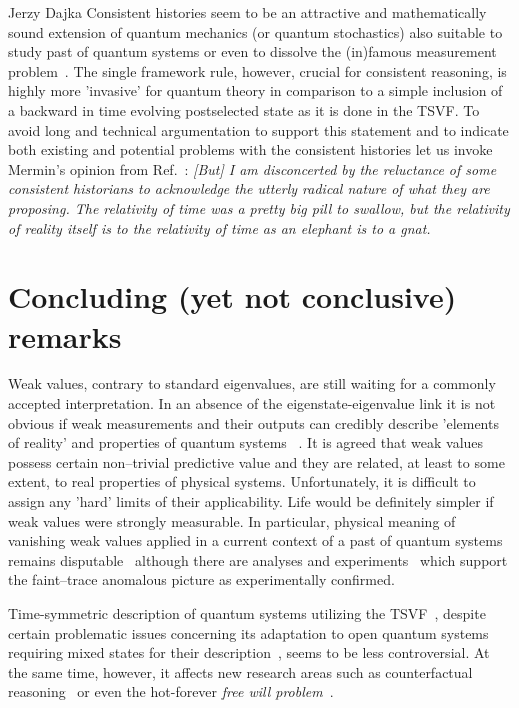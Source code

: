 \begin{artengenv}{Jerzy Dajka}
%
Consistent histories seem to be an attractive and mathematically sound extension of quantum mechanics (or quantum stochastics) also suitable to study past of quantum systems  or even  to dissolve the  (in)famous measurement problem~\parencite{GRIFFITHS_measur,Griffiths_reason}. The single framework rule, however, crucial for consistent reasoning, is highly more 'invasive' for quantum theory in comparison to a simple inclusion of a backward in time evolving postselected state as it is done in the TSVF. To avoid long and technical argumentation  to support this statement and to indicate both existing and potential problems with the consistent histories let us invoke Mermin's opinion from   
Ref.~\parencite{mermin}:
{\it [But] I am disconcerted by the reluctance of some consistent historians to
acknowledge the utterly radical nature of what they are proposing. The relativity of time was a pretty big pill to swallow, but the relativity of reality itself is
to the relativity of time as an elephant is to a gnat.}

\section{Concluding (yet not conclusive) remarks}

Weak values, contrary to standard eigenvalues, are still waiting for a commonly accepted interpretation. In an absence of the eigenstate-eigenvalue link it is not obvious if weak measurements and their outputs can credibly describe 'elements of reality' and properties of quantum systems ~\parencite{Matzkin_prop,vaid_trans}. It is agreed that weak values possess certain non--trivial predictive value and they are related, at least to some extent, to real properties of physical systems. Unfortunately, it is difficult to assign any 'hard' limits of their applicability. Life would be definitely simpler if weak values were strongly measurable. In particular,  
  physical meaning of vanishing weak values applied in  a current context of a past of quantum systems  remains disputable~\parencite{PhysRevA.95.032110,PhysRevA.97.046102,PhysRevA.97.046103,weak,lady} although  there are analyses and experiments~\parencite{e20110854,PhysRevA.101.052119,pnas,pnas1} which support the faint--trace anomalous picture as experimentally confirmed.   

Time-symmetric description of quantum systems utilizing the TSVF~\parencite{aharonov_entrop,Aharonov2008}, despite certain problematic issues concerning its adaptation to open quantum systems requiring mixed states for their description~\parencite{weak,scirep},   seems to be less controversial. At the same time, however, it affects new research areas such as counterfactual reasoning~\parencite{kont0}  or even the hot-forever {\it free will problem}~\parencite{wil}. 


\end{artengenv}
